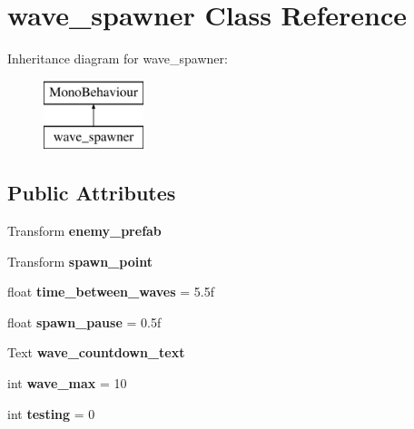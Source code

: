 \hypertarget{classwave__spawner}{}\section{wave\+\_\+spawner Class Reference}
\label{classwave__spawner}
Inheritance diagram for wave\+\_\+spawner\+:\begin{figure}[H]
\begin{center}
\leavevmode
\includegraphics[height=2.000000cm]{classwave__spawner}
\end{center}
\end{figure}
\subsection*{Public Attributes}
\begin{DoxyCompactItemize}
\item 
\mbox{\label{classwave__spawner_ab4dc5725df6456980068ee94a159d361}} 
Transform {\bfseries enemy\+\_\+prefab}
\item 
\mbox{\label{classwave__spawner_a1b18aba1e910346fb16de96894d3d4fa}} 
Transform {\bfseries spawn\+\_\+point}
\item 
\mbox{\label{classwave__spawner_abbc823be2179bae1976ed1751abf9c15}} 
float {\bfseries time\+\_\+between\+\_\+waves} = 5.\+5f
\item 
\mbox{\label{classwave__spawner_a5a53cfa452310466ba0770f00c2911a5}} 
float {\bfseries spawn\+\_\+pause} = 0.\+5f
\item 
\mbox{\label{classwave__spawner_a7fed1f46da7e53b59badb80c26e0941c}} 
Text {\bfseries wave\+\_\+countdown\+\_\+text}
\item 
\mbox{\label{classwave__spawner_abf42ed3ce54dbfa0d76c39298513501d}} 
int {\bfseries wave\+\_\+max} = 10
\item 
\mbox{\label{classwave__spawner_a6059e8fd76ba1f7b5b17bdbe80f919b2}} 
int {\bfseries testing} = 0
\end{DoxyCompactItemize}
